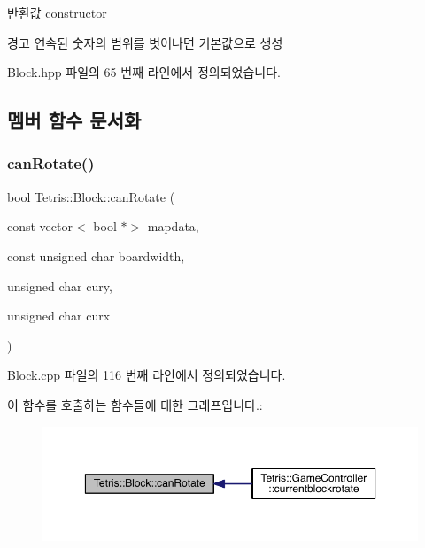 \begin{DoxyReturn}{반환값}
constructor 
\end{DoxyReturn}
\begin{DoxyWarning}{경고}
연속된 숫자의 범위를 벗어나면 기본값으로 생성 
\end{DoxyWarning}


Block.\+hpp 파일의 65 번째 라인에서 정의되었습니다.



\subsection{멤버 함수 문서화}
\mbox{\label{class_tetris_1_1_block_a56d194d0a5d56d2d1220ec32774cea38}} 
\subsubsection{\texorpdfstring{can\+Rotate()}{canRotate()}\hspace{0.1cm}{\footnotesize\ttfamily [1/2]}}
{\footnotesize\ttfamily bool Tetris\+::\+Block\+::can\+Rotate (\begin{DoxyParamCaption}\item[{const vector$<$ bool $\ast$$>$}]{mapdata,  }\item[{const unsigned char}]{boardwidth,  }\item[{unsigned char}]{cury,  }\item[{unsigned char}]{curx }\end{DoxyParamCaption})}



Block.\+cpp 파일의 116 번째 라인에서 정의되었습니다.

이 함수를 호출하는 함수들에 대한 그래프입니다.\+:
\nopagebreak
\begin{figure}[H]
\begin{center}
\leavevmode
\includegraphics[width=350pt]{class_tetris_1_1_block_a56d194d0a5d56d2d1220ec32774cea38_icgraph}
\end{center}
\end{figure}
\mbox{\label{class_tetris_1_1_block_a56d194d0a5d56d2d1220ec32774cea38}} 
